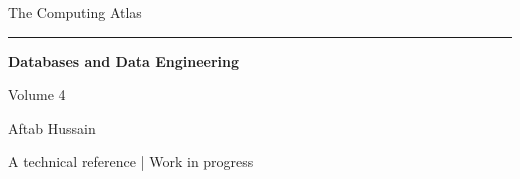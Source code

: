 \documentclass[11pt,oneside,openany]{book}
\begin{document}
\frontmatter
\begin{titlepage}
\centering
\vspace*{3.7cm}
{\Large The Computing Atlas\par}
\vspace{0.65cm}
\rule{0.6\textwidth}{0.5pt}\par
\vspace{0.75cm}
{\Huge\bfseries Databases and Data Engineering\par}
\vspace{1.0cm}
{\large Volume 4\par}
\vfill
{\large Aftab Hussain\par}
\vspace{0.6cm}
{\small A technical reference | Work in progress\par}
\vspace{1.2cm}
\end{titlepage}
\tableofcontents
\mainmatter

\end{document}
